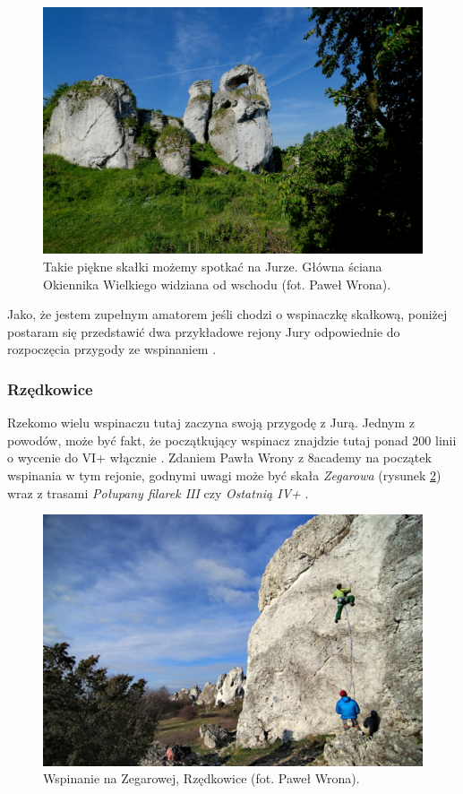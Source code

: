 \documentclass{article}
\begin{document}
\begin{figure}[!htbp]
	\begin{center}
		\includegraphics[width=0.9\linewidth]{images/jura-okiennik.eps}
	\end{center}
	\caption{Takie piękne skałki możemy spotkać na Jurze. Główna ściana Okiennika Wielkiego widziana od wschodu (fot. Paweł Wrona)\cite{jura-okiennik}.}
	\label{}
\end{figure}

Jako, że jestem zupełnym amatorem jeśli chodzi o wspinaczkę skałkową, poniżej postaram się przedstawić dwa przykładowe rejony Jury odpowiednie do rozpoczęcia przygody ze wspinaniem \cite{jura-okiennik}. 

\subsubsection{Rzędkowice}
Rzekomo wielu wspinaczu tutaj zaczyna swoją przygodę z Jurą. Jednym z powodów, może być fakt, że początkujący wspinacz znajdzie tutaj ponad 200 linii o wycenie do VI+ włącznie \cite{jura-rzedkowice}. Zdaniem Pawła Wrony z 8academy na początek wspinania w tym rejonie, godnymi uwagi może być skała \textit{Zegarowa} (rysunek \ref{zegarowa}) wraz z trasami \textit{Połupany filarek III} czy \textit{Ostatnią IV+} \cite{jura-rzedkowice}.

\begin{figure}[!htbp]
	\begin{center}
		\includegraphics[width=0.9\linewidth]{images/jura-zegarowa.eps}
	\end{center}
	\caption{Wspinanie na Zegarowej, Rzędkowice (fot. Paweł Wrona)\cite{jura-rzedkowice}.}
	\label{zegarowa}
\end{figure}
\end{document}
